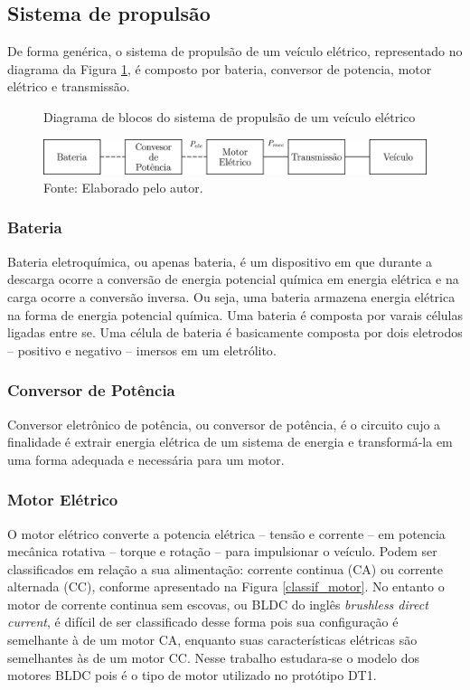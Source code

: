 \subsection{Sistema de propulsão}
\label{subsec:sistema_propulsao}

De forma genérica, o sistema de propulsão de um veículo elétrico, representado no diagrama da Figura \ref{fig:diagrama_propulsao}, é composto por
bateria, conversor de potencia, motor elétrico e transmissão.

\begin{figure}[H]
	\centering
	\caption{Diagrama de blocos do sistema de propulsão de um veículo elétrico}
	\label{fig:diagrama_propulsao}
	\includegraphics{DescricaoProcesso/Figuras/g874.png}
	\caption*{\footnotesize Fonte: Elaborado pelo autor.}
\end{figure}

\subsubsection{Bateria}

Bateria eletroquímica, ou apenas bateria, é um dispositivo em que durante a descarga ocorre a conversão de energia potencial química em energia
elétrica e na carga ocorre a conversão inversa. Ou seja, uma bateria armazena energia elétrica na forma de energia potencial química. Uma bateria é
composta por varais células ligadas entre se. Uma célula de bateria é basicamente composta por dois eletrodos -- positivo e
negativo -- imersos em um eletrólito\cite{book:Modern_Electric_Vehicles}.

\subsubsection{Conversor de Potência}

Conversor eletrônico de potência, ou conversor de potência, é o circuito cujo a finalidade é extrair energia elétrica de um sistema de energia e
transformá-la em uma forma adequada e necessária para um motor\cite{book:Electric_Motor_Control}.

\subsubsection{Motor Elétrico}

O motor elétrico converte a potencia elétrica -- tensão e corrente -- em potencia mecânica rotativa -- torque e rotação -- para impulsionar o
veículo.\cite{book:Modern_Electric_Vehicles} Podem ser classificados em relação a sua alimentação: corrente continua
(CA) ou corrente alternada (CC), conforme apresentado na Figura \ref{classif_motor}.
No entanto o motor de corrente continua sem escovas, ou BLDC do inglês \textit{brushless direct current}, é difícil de ser classificado desse forma
pois sua configuração é semelhante à de um motor CA, enquanto suas características elétricas são semelhantes às de um motor
CC.\cite{book:Electric_Motor_Control} Nesse trabalho estudara-se o modelo dos motores BLDC pois é o tipo de motor utilizado no protótipo DT1.

